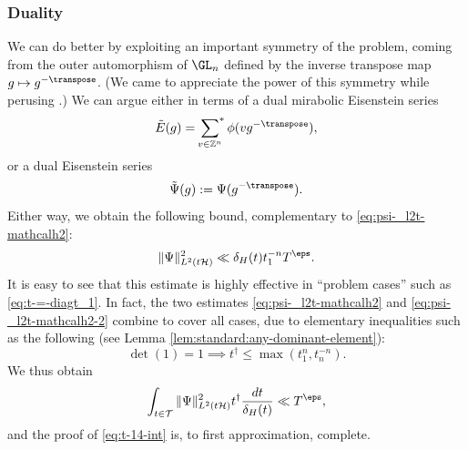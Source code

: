 \subsubsection{Duality}\label{sec:duality-1}
We can do better by exploiting an important symmetry of the problem, coming from the outer automorphism of $\GL_n$ defined by the inverse transpose map $g \mapsto g^{-\transpose}$.  (We came to appreciate the power of this symmetry while perusing \cite[\S3.3]{MR4093914}.)  We can argue either in terms of a dual mirabolic Eisenstein series
\begin{equation*}
  \tilde{E}(g) = \sideset{}{^*}\sum_{v \in \mathbb{Z}^n} \phi(v g^{-\transpose}),
\end{equation*}
or a dual Eisenstein series
\begin{equation*}
  \tilde{\Psi}(g) := \Psi(g^{-\transpose}).
\end{equation*}
Either way, we obtain the following bound, complementary to \eqref{eq:psi-_l2t-mathcalh2}:
\begin{equation}\label{eq:psi-_l2t-mathcalh2-2}
  \|\Psi \|_{L^2(t \mathcal{H})}^2 \ll \delta_H(t) t_1^{-n} T^{\eps}.
\end{equation}
It is easy to see that this estimate is highly effective in ``problem cases'' such as \eqref{eq:t-=-diagt_1}.  In fact, the two estimates \eqref{eq:psi-_l2t-mathcalh2} and \eqref{eq:psi-_l2t-mathcalh2-2} combine to cover all cases, due to elementary inequalities such as the following (see Lemma \ref{lem:standard:any-dominant-element}):
\begin{equation}\label{eq:cujyyxote2}
  \det(1) = 1 \implies t^\dagger \leq \max(t_1^n, t_n^{-n}).
\end{equation}
We thus obtain
\begin{equation}\label{eq:int-_t-in-Psi-t-dagger}
  \int_{t  \in \mathcal{T} }
  \|\Psi \|_{L^2(t \mathcal{H})}^2
  t^\dagger
  \frac{d t}{\delta_H(t)} \ll T^{\eps},
\end{equation}
and the proof of \eqref{eq:t-14-int} is, to first approximation, complete.

